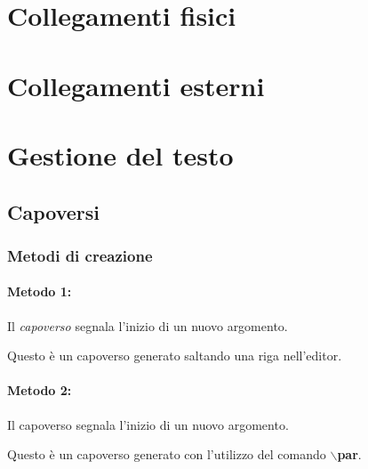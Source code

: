 \documentclass[a4paper]{book}
\begin{document}
	
	\chapter{Collegamenti fisici}
	
	\chapter{Collegamenti esterni}
	
	
	\chapter{Gestione del testo}
	\section{Capoversi}
	\subsection{Metodi di creazione}
	\subsubsection{Metodo 1:}
	Il \emph{capoverso} segnala l'inizio di un nuovo argomento.
	
	Questo è un capoverso generato saltando una riga nell'editor.
	\subsubsection{Metodo 2:}
	Il capoverso segnala l'inizio di un nuovo argomento.
	\par Questo è un capoverso generato con l'utilizzo del comando \textbf{$\backslash$par}.
	
	
	
	
	
	
	
	
	
	
	
	
	
	
	
	
	
	
	
	
	
	
	
	
	
	
	
	
	
	
	
	
	
	
	
\end{document}
